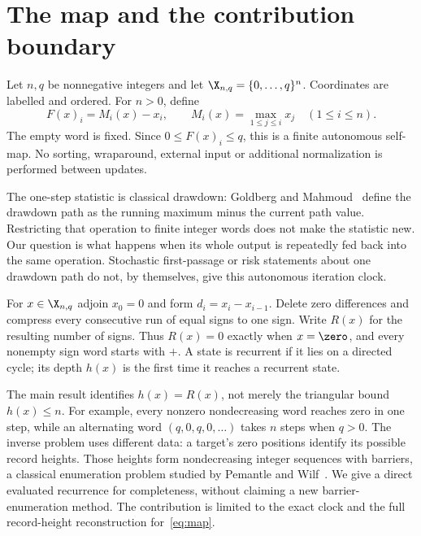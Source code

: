 \section{The map and the contribution boundary}

Let $n,q$ be nonnegative integers and let
$\X_{n,q}=\{0,\ldots,q\}^n$. Coordinates are labelled and ordered.
For $n>0$, define
\begin{equation}\label{eq:map}
 F(x)_i=M_i(x)-x_i,\qquad
 M_i(x)=\max_{1\le j\le i}x_j\quad(1\le i\le n).
\end{equation}
The empty word is fixed. Since $0\le F(x)_i\le q$, this is a finite
autonomous self-map. No sorting, wraparound, external input or additional
normalization is performed between updates.

The one-step statistic is classical drawdown: Goldberg and
Mahmoud~\cite{goldberg2017drawdown} define the drawdown path as the
running maximum minus the current path value. Restricting that operation
to finite integer words does not make the statistic new. Our question is
what happens when its whole output is repeatedly fed back into the same
operation. Stochastic first-passage or risk statements about one drawdown
path do not, by themselves, give this autonomous iteration clock.

For $x\in\X_{n,q}$ adjoin $x_0=0$ and form
$d_i=x_i-x_{i-1}$. Delete zero differences and compress every consecutive
run of equal signs to one sign. Write $R(x)$ for the resulting number of
signs. Thus $R(x)=0$ exactly when $x=\zero$, and every nonempty sign word
starts with $+$. A state is recurrent if it lies on a directed cycle;
its depth $h(x)$ is the first time it reaches a recurrent state.

The main result identifies $h(x)=R(x)$, not merely the triangular bound
$h(x)\le n$. For example, every nonzero nondecreasing word reaches zero
in one step, while an alternating word $(q,0,q,0,\ldots)$ takes $n$
steps when $q>0$. The inverse problem uses different data: a target's
zero positions identify its possible record heights. Those heights form
nondecreasing integer sequences with barriers, a classical enumeration
problem studied by Pemantle and Wilf~\cite{pemantle2009barrier}.
We give a direct evaluated recurrence for completeness, without claiming
a new barrier-enumeration method. The contribution is limited to the
exact clock and the full record-height reconstruction for~\eqref{eq:map}.
